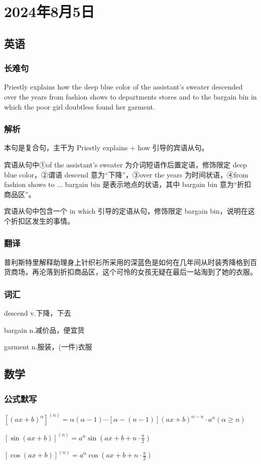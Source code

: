 \documentclass[UTF8]{ctexart}
\begin{document}
\section{2024年8月5日}
\subsection{英语}
\subsubsection{长难句}
Priestly explains how the deep blue color of the assistant's sweater descended over the years from fashion shows to departments stores and to the bargain bin in which the poor girl doubtless found her garment.
\subsubsection{解析}
本句是复合句，主干为 Priestly explains + how 引导的宾语从句。

宾语从句中①of the assistant's sweater 为介词短语作后置定语，修饰限定 deep blue color，②谓语 descend 意为“下降”，③over the years 为时间状语，④from fashion shows to ... bargain bin 是表示地点的状语，其中 bargain bin 意为“折扣商品区”。

宾语从句中包含一个 in which 引导的定语从句，修饰限定 bargain bin，说明在这个折扣区发生的事情。
\subsubsection{翻译}
普利斯特里解释助理身上针织衫所采用的深蓝色是如何在几年间从时装秀降格到百货商场，再沦落到折扣商品区，这个可怜的女孩无疑在最后一站淘到了她的衣服。
\subsubsection{词汇}
descend v.下降，下去

bargain n.减价品，便宜货

garment n.服装，(一件)衣服
\subsection{数学}
\subsubsection{公式默写}

$[(ax+b)^\alpha]^{(n)}=\alpha(\alpha-1)\cdots[\alpha-(n-1)](ax+b)^{\alpha -n}\cdot a^n(\alpha\ge n)$
\begin{multicols}{2}
      $[\sin(ax+b)]^{(n)}=a^n\sin(ax+b+n\cdot\frac{\pi}{2})$

      $[\cos(ax+b)]^{(n)}=a^n\cos(ax+b+n\cdot\frac{\pi}{2})$
\end{multicols}
\end{document}
